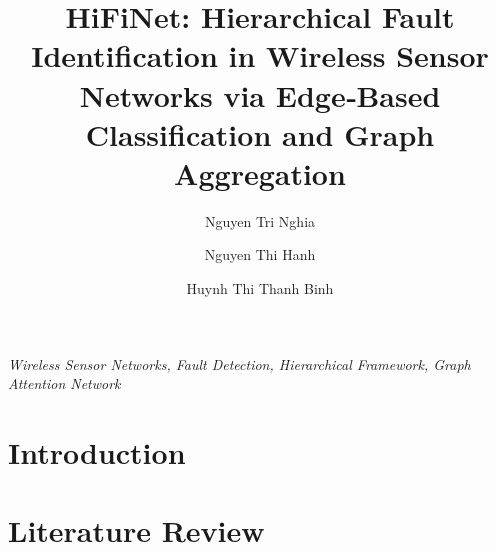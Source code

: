 \documentclass[preprint,12pt]{elsarticle}
\begin{document}
\begin{frontmatter}

\title{HiFiNet: Hierarchical Fault Identification in Wireless Sensor Networks via Edge‑Based Classification and Graph Aggregation}

\author[hust]{Nguyen Tri Nghia}
\author[pnk]{Nguyen Thi Hanh}
\author[hust]{Huynh Thi Thanh Binh}
\address[hust]{Hanoi University of Science and Technology, Vietnam}
\address[pnk]{Faculty of Interdisciplinary Digital Technology (FIDT), PHENIKAA University, Vietnam}



\begin{keyword}
\textit{Wireless Sensor Networks, Fault Detection, Hierarchical Framework, Graph Attention Network}
\end{keyword}

\end{frontmatter}

\section{Introduction}


\section{Literature Review}



\end{document}
